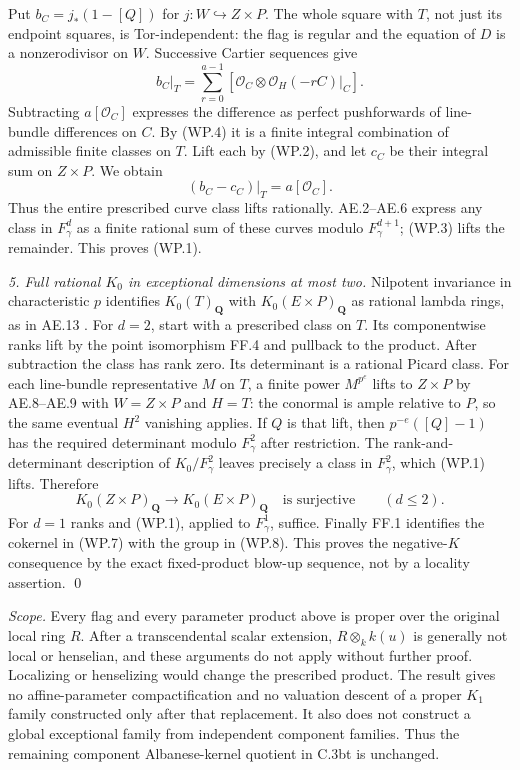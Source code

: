 Put $b_C=j_*(1-[Q])$ for $j:W\hookrightarrow Z\times P$.
The whole square with $T$, not just its endpoint squares, is
Tor-independent: the flag is regular and the equation of $D$
is a nonzerodivisor on $W$.  Successive Cartier sequences give
\begin{equation}
       b_C|_T=\sum_{r=0}^{a-1}
          [\mathcal O_C\otimes\mathcal O_H(-rC)|_C].   \tag{WP.5}
\end{equation}
Subtracting $a[\mathcal O_C]$ expresses the difference as perfect
pushforwards of line-bundle differences on $C$.
By (WP.4) it is a finite integral combination of admissible finite
classes on $T$.  Lift each by (WP.2), and let $c_C$ be their integral
sum on $Z\times P$.  We obtain
\begin{equation}
                   (b_C-c_C)|_T=a[\mathcal O_C].       \tag{WP.6}
\end{equation}
Thus the entire prescribed curve class lifts rationally.
AE.2--AE.6 express any class in $F_\gamma^d$ as a finite rational
sum of these curves modulo $F_\gamma^{d+1}$; (WP.3) lifts the
remainder.  This proves (WP.1).

\emph{5. Full rational $K_0$ in exceptional dimensions at most two.}
Nilpotent invariance in characteristic $p$ identifies
$K_0(T)_{\mathbf Q}$ with $K_0(E\times P)_{\mathbf Q}$ as rational
lambda rings, as in AE.13
\citep[Theorem A]{rootGeisserHesselholt2011}.
For $d=2$, start with a prescribed class on $T$.
Its componentwise ranks lift by the point isomorphism FF.4 and
pullback to the product.  After subtraction the class has rank zero.
Its determinant is a rational Picard class.
For each line-bundle representative $M$ on $T$, a finite power
$M^{p^e}$ lifts to $Z\times P$ by AE.8--AE.9 with $W=Z\times P$
and $H=T$: the conormal is ample relative to $P$, so the same eventual
$H^2$ vanishing applies.  If $Q$ is that lift, then
$p^{-e}([Q]-1)$ has the required determinant modulo
$F_\gamma^2$ after restriction.  The rank-and-determinant description
of $K_0/F_\gamma^2$ leaves precisely a class in $F_\gamma^2$, which
(WP.1) lifts.  Therefore
\begin{equation}
 K_0(Z\times P)_{\mathbf Q}\longrightarrow
                  K_0(E\times P)_{\mathbf Q}
       \quad\text{is surjective}\qquad(d\leq2).       \tag{WP.7}
\end{equation}
For $d=1$ ranks and (WP.1), applied to $F_\gamma^1$, suffice.
Finally FF.1 identifies the cokernel in (WP.7) with the group in
(WP.8).  This proves the negative-$K$ consequence by the exact
fixed-product blow-up sequence, not by a locality assertion.
\qed

\emph{Scope.}
Every flag and every parameter product above is proper over the
original local ring $R$.  After a transcendental scalar extension,
$R\otimes_k k(u)$ is generally not local or henselian, and these
arguments do not apply without further proof.  Localizing or
henselizing would change the prescribed product.  The result gives
no affine-parameter compactification and no valuation descent of
a proper $K_1$ family constructed only after that replacement.
It also does not construct a global exceptional family from
independent component families.  Thus the remaining component
Albanese-kernel quotient in C.3bt is unchanged.
